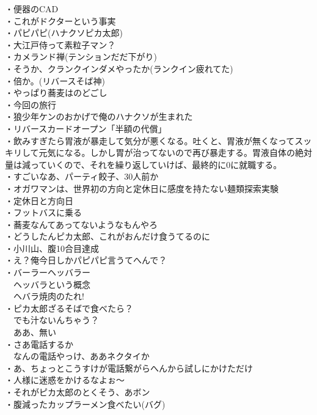 \documentclass[12pt]{jsarticle}
\begin{document}
・便器のCAD\\
・これがドクターという事実\\
・パピパピ(ハナクソピカ太郎)\\
・大江戸侍って素粒子マン？\\
・カメランド禅(テンションだだ下がり)\\
・そうか、クランクインダメやったか(ランクイン疲れてた)\\
・倍か。(リバースそば神)\\
・やっぱり蕎麦はのどごし\\
・今回の旅行\\
・狼少年ケンのおかげで俺のハナクソが生まれた\\
・リバースカードオープン「半額の代償」\\
・飲みすぎたら胃液が暴走して気分が悪くなる。吐くと、胃液が無くなってスッキリして元気になる。しかし胃が治ってないので再び暴走する。胃液自体の絶対量は減っていくので、それを繰り返していけば、最終的に0に就職する。\\
・すごいなあ、パーティ餃子、30人前か\\
・オガワマンは、世界初の方向と定休日に感度を持たない麺類探索実験\\
・定休日と方向日\\
・フットバスに乗る\\
・蕎麦なんてあってないようなもんやろ\\
・どうしたんピカ太郎、これがおんだけ食うてるのに\\
・小川山、腹10合目達成\\
・え？俺今日しかパピパピ言うてへんで？\\
・バーラーヘッバラー\\
　ヘッバラという概念\\
　ヘバラ焼肉のたれ!\\
・ピカ太郎ざるそばで食べたら？\\
　でも汁ないんちゃう？\\
　ああ、無い\\
・さあ電話するか\\
　なんの電話やっけ、ああネクタイか\\
・あ、ちょっとこうすけが電話繋がらへんから試しにかけただけ\\
・人様に迷惑をかけるなよぉ〜\\
・それがピカ太郎のとくそう、あボン\\
・腹減ったカップラーメン食べたい(バグ)\\
\end{document}
